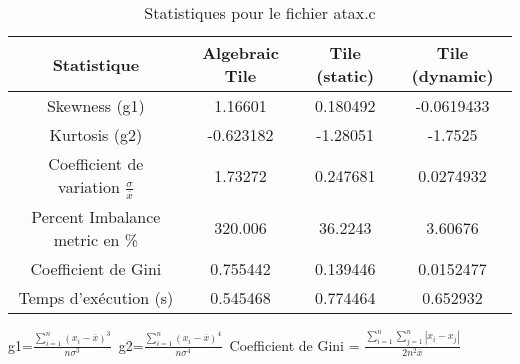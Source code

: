 \documentclass{article}
\begin{document}
\begin{table}[htbp]
  \centering
  \caption{Statistiques pour le fichier atax.c}
  \begin{tabular}{|c|c|c|c|}
    \hline
    Statistique & Algebraic Tile & Tile (static) & Tile (dynamic) \\ 
    \hline
    Skewness (g1)  & 1.16601 & 0.180492 & -0.0619433 \\ 
    Kurtosis (g2)  & -0.623182 & -1.28051 & -1.7525 \\ 
    Coefficient de variation $ \frac{\sigma}{\overline{x}} $ & 1.73272 & 0.247681 & 0.0274932\\ 
    Percent Imbalance metric en \% & 320.006 & 36.2243 & 3.60676\\ 
    Coefficient de Gini  & 0.755442 & 0.139446 & 0.0152477\\ 
    Temps d'exécution (s) &  0.545468    &  0.774464   &  0.652932   \\ 

    \hline
  \end{tabular}
\end{table}
g1=$ \frac{\sum_{i=1}^{n} (x_i - \overline{x})^3}{n\sigma^3} $\
g2=$ \frac{\sum_{i=1}^{n} (x_i - \overline{x})^4}{n\sigma^4} $\
Coefficient de Gini = $ \frac{\sum_{i=1}^{n}\sum_{j=1}^{n} |x_i - x_j|}{2n^2\overline{x}} $\
\newpage
\end{document}
